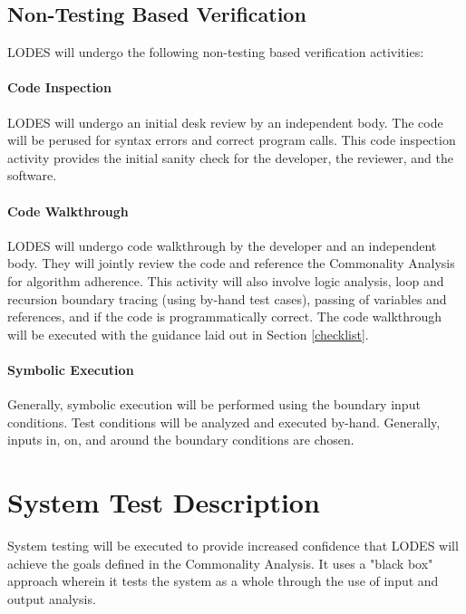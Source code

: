 \documentclass[12pt, titlepage]{article}
\newcommand{\famname}{LODES} %
\begin{document}
		

\subsection{Non-Testing Based Verification}
\famname{} will undergo the following non-testing based verification activities:

\paragraph{Code Inspection\\}
\famname{} will undergo an initial desk review by an independent body.
The code will be perused for syntax errors and correct program calls.
This code inspection activity provides the initial sanity check for the developer, the reviewer, and the software.

\paragraph{Code Walkthrough\\}
\famname{} will undergo code walkthrough by the developer and an independent body.
They will jointly review the code and reference the Commonality Analysis for algorithm adherence. This activity
will also involve logic analysis, loop and recursion boundary tracing (using by-hand test cases), passing of
variables and references, and if the code is programmatically correct. The code walkthrough will be executed
with the guidance laid out in Section \ref{checklist}.

\paragraph{Symbolic Execution\\}
Generally, symbolic execution will be performed using the boundary input conditions. Test conditions will be
analyzed and executed by-hand. Generally, inputs in, on, and around the boundary conditions are chosen.


\section{System Test Description}
System testing will be executed to provide increased confidence that \famname{} will achieve the goals defined in 
the Commonality Analysis. It uses a "black box" approach wherein it tests the system as a whole through the use 
of input and output analysis.
\end{document}
